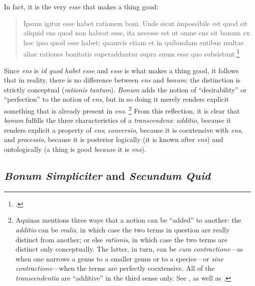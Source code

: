 {In fact, it is the very \emph{esse} that makes a thing good:
%
\begin{quotation}
Ipsum igitur esse habet rationem boni. Unde sicut impossibile est quod sit aliquid ens quod non habeat esse, ita necesse est ut omne ens sit bonum ex hoc ipso quod esse habet; quamvis etiam et in quibusdam entibus multae aliae rationes bonitatis superaddantur supra suum esse quo subsistunt.\footcite[q.~21, a.~2]{st:deveritate}
\end{quotation}
%
Since \emph{ens} is \emph{id quod habet esse} and \emph{esse} is what makes a thing good, it follows that in reality, there is no difference between \emph{ens} and \emph{bonum}: the distinction is strictly conceptual (\emph{rationis tantum}). \emph{Bonum} adds the notion of ``desirability'' or ``perfection'' to the notion of \emph{ens}, but in so doing it merely renders explicit something that is already present in \emph{ens}.%
%
\footnote{Aquinas mentions three ways that a notion can be ``added'' to another: the \emph{additio} can be \emph{realis}, in which case the two terms in question are really distinct from another; or else \emph{rationis}, in which case the two terms are distinct only conceptually. The latter, in turn, can be \emph{cum contractione}---as when one narrows a genus to a smaller genus or to a species---or \emph{sine contractione}---when the terms are perfectly coextensive. All of the \emph{transcendentia} are ``additive'' in the third sense only. See \cite[q.~21, a.~1, co., and q.~1, a.~1, co.]{st:deveritate}, as well as \cite[See also][192]{wippel:metaphysical_thought}.} From this reflection, it is clear that \emph{bonum} fulfills the three characteristics of a \emph{transcendens}: \emph{additio}, because it renders explicit a property of \emph{ens}; \emph{conversio}, because it is coextensive with \emph{ens}, and \emph{processio}, because it is posterior logically (it is known after \emph{ens}) and ontologically (a thing is good \emph{because} it is \emph{ens}).

\subsection{\emph{Bonum Simpliciter} and  \emph{Secundum Quid}}

}
